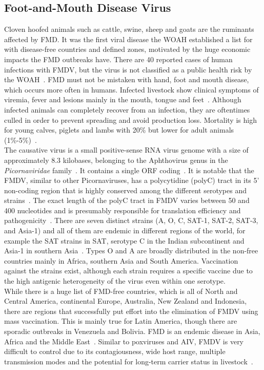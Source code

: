 \subsection{Foot-and-Mouth Disease Virus}
Cloven hoofed animals such as cattle, swine, sheep and goats are the ruminants affected by \ac{FMD}. It was the first viral disease the \ac{WOAH} established a list for with disease-free countries and defined zones, motivated by the huge economic impacts the \ac{FMD} outbreaks have. There are 40 reported cases of human infections with \ac{FMDV}, but the virus is not classified as a public health risk by the \ac{WOAH}~\cite{woah2023fmd}. \ac{FMD} must not be mistaken with hand, foot and mouth disease, which occurs more often in humans. Infected livestock show clinical symptoms of viremia, fever and lesions mainly in the mouth, tongue and feet~\cite{domingo1990genetic}. Although infected animals can completely recover from an infection, they are oftentimes culled in order to prevent spreading and avoid production loss. Mortality is high for young calves, piglets and lambs with 20\% but lower for adult animals (1\%-5\%)~\cite{woah2023fmd}. \\
The causative virus is a small positive-sense \ac{RNA} virus genome with a size of approximately 8.3 kilobases, belonging to the Aphthovirus genus in the \textit{Picornaviridae} family~\cite{tax2021virus}. It contains a single \ac{ORF} coding~\cite{ryan1989specificity}. It is notable that the \ac{FMDV}, similar to other Picornaviruses, has a polycytidine (polyC) tract in its 5' non-coding region that is highly conserved among the different serotypes and strains~\cite{penza2021long}. The exact length of the polyC tract in \ac{FMDV} varies between 50 and 400 nucleotides and is presumably responsible for translation efficiency and pathogenicity~\cite{penza2021long}. There are seven distinct strains (A, O, C, SAT-1, SAT-2, SAT-3, and Asia-1) and all of them are endemic in different regions of the world, for example the SAT strains in \ac{SAT}, serotype C in the Indian subcontinent and Asia-1 in southern Asia~\cite{knowles2003molecular}. Types O and A are broadly distributed in the non-free countries mainly in Africa, southern Asia and South America. Vaccination against the strains exist, although each strain requires a specific vaccine due to the high antigenic heterogeneity of the virus even within one serotype. \\
While there is a huge list of \ac{FMD}-free countries, which is all of North and Central America, continental Europe, Australia, New Zealand and Indonesia, there are regions that successfully put effort into the elimination of \ac{FMDV} using mass vaccination. This is mainly true for Latin America, though there are sporadic outbreaks in Venezuela and Bolivia. \ac{FMD} is an endemic disease in Asia, Africa and the Middle East~\cite{brito2017review}. Similar to poxviruses and \ac{AIV}, \ac{FMDV} is very difficult to control due to its contagiousness, wide host range, multiple transmission modes and the potential for long-term carrier status in livestock~\cite{firestone2019reconstructing}. \\

